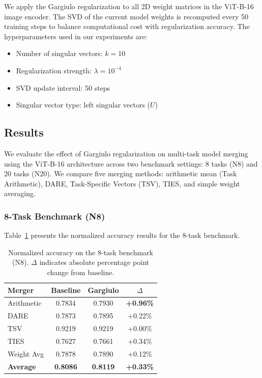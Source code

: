 We apply the Gargiulo regularization to all 2D weight matrices in the ViT-B-16 image encoder. The SVD of the current model weights is recomputed every 50 training steps to balance computational cost with regularization accuracy. The hyperparameters used in our experiments are:
\begin{itemize}
    \item Number of singular vectors: $k = 10$
    \item Regularization strength: $\lambda = 10^{-4}$
    \item SVD update interval: 50 steps
    \item Singular vector type: left singular vectors ($U$)
\end{itemize}

\subsection{Results}

We evaluate the effect of Gargiulo regularization on multi-task model merging using the ViT-B-16 architecture across two benchmark settings: 8 tasks (N8) and 20 tasks (N20). We compare five merging methods: arithmetic mean (Task Arithmetic), DARE, Task-Specific Vectors (TSV), TIES, and simple weight averaging.

\subsubsection{8-Task Benchmark (N8)}

Table~\ref{tab:gargiulo_n8} presents the normalized accuracy results for the 8-task benchmark.

\begin{table}[h]
\centering
\caption{Normalized accuracy on the 8-task benchmark (N8). $\Delta$ indicates absolute percentage point change from baseline.}
\label{tab:gargiulo_n8}
\begin{tabular}{lccc}
\toprule
\textbf{Merger} & \textbf{Baseline} & \textbf{Gargiulo} & \textbf{$\Delta$} \\
\midrule
Arithmetic & 0.7834 & 0.7930 & \textbf{+0.96\%} \\
DARE       & 0.7873 & 0.7895 & +0.22\% \\
TSV        & 0.9219 & 0.9219 & +0.00\% \\
TIES       & 0.7627 & 0.7661 & +0.34\% \\
Weight Avg & 0.7878 & 0.7890 & +0.12\% \\
\midrule
\textbf{Average} & \textbf{0.8086} & \textbf{0.8119} & \textbf{+0.33\%} \\
\bottomrule
\end{tabular}
\end{table}

